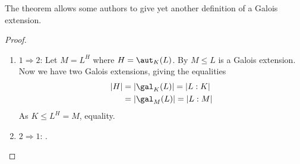 \documentclass[a4paper]{article}
\begin{document}
\begin{remark}
  The theorem allows some authors to give yet another definition of a Galois extension.
\end{remark}

\begin{proof}\leavevmode
  \begin{enumerate}
  \item \(1 \Rightarrow 2\): Let \(M = L^H\) where \(H = \aut_K(L)\). By  \(M \leq L\) is a Galois extension. Now we have two Galois extensions, giving the equalities
    \begin{align*}
      |H| &= |\gal_K(L)| = |L:K| \\
          &= |\gal_M(L)| = |L:M|
    \end{align*}
    As \(K \leq L^H = M\), equality.
  \item \(2 \Rightarrow 1\): .
  \end{enumerate}
\end{proof}
\end{document}
